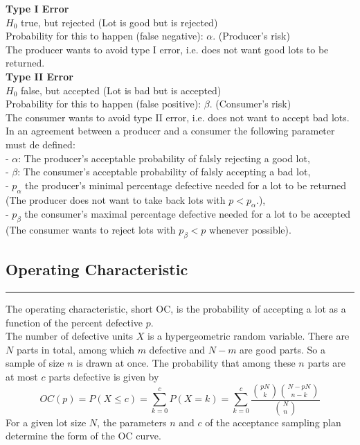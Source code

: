 \textbf{Type I Error}\\
$H_0$ true, but rejected (Lot is good but is rejected)\\
Probability for this to happen (false negative): $\alpha$. (Producer's risk)\\
The producer wants to avoid type I error, i.e. does not want good lots to be returned.\\

\textbf{Type II Error}\\
$H_0$ false, but accepted (Lot is bad but is accepted)\\
Probability for this to happen (false positive): $\beta$. (Consumer's risk)\\
The consumer wants to avoid type II error, i.e. does not want to accept bad lots.\\


In an agreement between a producer and a consumer the following parameter must de defined:\\
- $\alpha$: The producer's acceptable probability of falsly rejecting a good lot,\\
- $\beta$: The consumer's acceptable probability of falsly accepting a bad lot,\\
- $p_{\alpha}$ the producer's minimal percentage defective needed for a lot to be returned (The producer does not want to take back lots with $p < p_{\alpha}$.),\\
- $p_{\beta}$ the consumer's maximal percentage defective needed for a lot to be accepted (The consumer wants to reject lots with $p_{\beta} < p$ whenever possible).

\subsection{Operating Characteristic}
\noindent\rule[\linienAbstand]{\linewidth}{\linienDicke}
The operating characteristic, short OC, is the probability of accepting a lot as a function of the percent defective $p$.\\
The number of defective units $X$ is a hypergeometric random variable. There are $N$ parts in total, among which $m$ defective and $N - m$ are good parts. So a sample of size $n$ is drawn at once. The probability that among these $n$ parts are at most $c$ parts defective is given by
\begin{equation}
  OC(p) = P(X \leq c)= \sum^c_{k=0} P(X = k) = \sum^c_{k=0} \frac{\binom{pN}{k}\binom{N-pN}{n-k}}{\binom{N}{n}}
  \label{eq:OC}
\end{equation}
For a given lot size $N$, the parameters $n$ and $c$ of the acceptance sampling plan determine the form of the OC curve.\\

